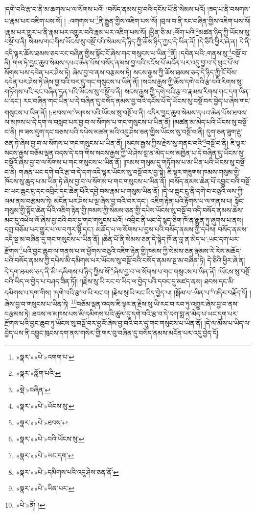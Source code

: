།དགེ་བའི་རྩ་བ་ནི་མ་ཆགས་པ་ལ་སོགས་པའོ། །བསོད་ནམས་བྱ་བའི་དངོས་པོ་ནི་སེམས་པའོ། །ཟད་པ་ནི་བསགས་པ་རྣམ་པར་འཇིག་པས་སོ། །
:འགགས་པ་\footnote{«སྣར་»«པེ་»འགག་པ་}ནི་རྒྱུན་གྱིས་འཇིག་པས་སོ། །བྲལ་བ་ནི་རང་བཞིན་གྱིས་འཇིག་པས་སོ། །རྣམ་པར་གྱུར་པ་ནི་རྣམ་པར་འགྱུར་བའི་རྣམ་པར་འཇིག་པས་སོ། །ཕྱིན་ཅི་མ་:ལོག་པའི་\footnote{«སྣར་»སློག་པའི་}མཚན་ཉིད་ཀྱི་ཡོངས་སུ་བསྔོ་བ་ནི། སེམས་གང་གིས་ཡོངས་སུ་བསྔོ་བའི་སེམས་དེ་ཉིད་ཀྱི་ཆོས་ཉིད་ཀྱང་དེ་ཡིན་ནོ། །དེ་ཅིའི་ཕྱིར་ཞེ་ན། དེ་ནི་འདི་ལྟར་ཆོས་ཐམས་ཅད་རང་བཞིན་གྱིས་སྟོང་ངོ་ཞེས་གང་གསུངས་པ་ཡིན་\footnote{«སྡེ་»བཞིན་}ནོ། །དབེན་པའི་:གནས་སུ་\footnote{«སྣར་»«པེ་»ཡོངས་སུ་}བསྔོ་བ་ནི། གལ་ཏེ་བྱང་ཆུབ་སེམས་དཔའ་ཆེན་པོས་བསོད་ནམས་བྱ་བའི་དངོས་པོ་མངོན་པར་འདུ་བྱ་བ་དེ་ཕུང་པོ་ལ་སོགས་པས་དབེན་པར་ཤེས་ཏེ། ཞེས་བྱ་བ་ནས་བརྩམས་ཏེ། སངས་རྒྱས་ཀྱི་ཆོས་ཐམས་ཅད་དེ་ཉིད་ཀྱི་ངོ་བོས་དབེན་པར་ཤེས་ཏེ་ཞེས་བྱ་བའི་བར་དུ་གང་གསུངས་པ་ཡིན་ནོ། །སངས་རྒྱས་ཀྱི་ཆོས་དགེ་བའི་རྩ་བའི་རིགས་སུ་གཏོགས་པའི་རང་བཞིན་དྲན་པའི་ཡོངས་སུ་བསྔོ་བ་ནི། སངས་རྒྱས་ཀྱི་དགེ་བའི་རྩ་བ་རྣམས་རིགས་གང་དག་ཡིན་པ་དང་། རང་བཞིན་གང་ཡིན་པ་དེ་བཞིན་དུ་བསོད་ནམས་བྱ་བའི་དངོས་པོ་དེ་ཡོངས་སུ་བསྔོ་བར་བྱེད་པ་ཞེས་གང་གསུངས་པ་ཡིན་ནོ། །:ཐབས་ལ་\footnote{«སྣར་»«པེ་»ཐབས་}མཁས་པའི་ཡོངས་སུ་བསྔོ་བ་ནི། འདིར་བྱང་ཆུབ་སེམས་དཔའ་ཆེན་པོས་ཐབས་ལ་མཁས་པ་དེ་དག་ལ་བསླབ་པར་བྱ་བ་ལ་སོགས་པ་གང་གསུངས་པ་ཡིན་ནོ། །མཚན་མ་མེད་པའི་ཡོངས་སུ་བསྔོ་བ་ནི། ཁ་ཟས་དུག་དང་བཅས་པའི་དཔེས་མཚན་མའི་འདུ་ཤེས་ཅན་གྱིས་ཡོངས་སུ་བསྔོ་བ་ནི། དུག་ཅན་ཟུག་རྔུ་ཅན་ཏེ་ཞེས་བྱ་བ་ལ་སོགས་པ་གང་གསུངས་པ་ཡིན་ནོ། །སངས་རྒྱས་ཀྱིས་རྗེས་སུ་གནང་བའི་\footnote{«སྣར་»«པེ་»བའི་ཡོངས་སུ་}བསྔོ་བ་ནི། ཇི་ལྟར་སངས་རྒྱས་བཅོམ་ལྡན་འདས་དེ་དག་གིས་སངས་རྒྱས་ཀྱི་ཡེ་ཤེས་བླ་ན་མེད་པས་མཁྱེན་པ་དེ་བཞིན་དུ་ཡོངས་སུ་བསྔོའོ་ཞེས་བྱ་བ་ལ་སོགས་པ་གང་གསུངས་པ་ཡིན་ནོ། །ཁམས་གསུམ་དུ་གཏོགས་པ་མ་ཡིན་པའི་ཡོངས་སུ་བསྔོ་བ་ནི། གཞན་ཡང་དགེ་བའི་རྩ་བ་དེ་དག་འདི་ལྟར་ཡོངས་སུ་བསྔོ་བར་བྱ་སྟེ། ཇི་ལྟར་གཟུགས་ཁམས་གསུམ་གྱི་ཁོངས་སུ་ཆུད་པ་མ་ཡིན་ཏེ་ཞེས་བྱ་བ་ལ་སོགས་པ་གང་གསུངས་པ་ཡིན་ནོ། །བསོད་ནམས་ཆེན་པོ་འབྱུང་བའི་བསྔོ་བ་ཡང་ཆུང་ངུ་དང་འབྲིང་དང་ཆེན་པོའི་དབྱེ་བས་རྣམ་པ་གསུམ་ཡིན་ནོ། །དེ་ལ་ཆུང་ངུ་ནི་དགེ་བ་བཅུའི་ལས་ཀྱི་ལམ་ནས་བརྩམས་ཏེ། མངོན་པར་ཤེས་པ་ལྔ་ཞེས་བྱ་བའི་བར་དང་། འཇིག་རྟེན་པའི་རྟོགས་པ་ལ་གནས་པ། སྟོང་གསུམ་གྱི་སྟོང་ཆེན་པོའི་འཇིག་རྟེན་གྱི་ཁམས་ཀྱི་སེམས་ཅན་གྱི་དཔེས་ཡོངས་སུ་བསྔོ་བ་འདི་བསོད་ནམས་ཆེས་མང་དུ་འཕེལ་ལོ་ཞེས་བྱ་བའི་བར་དུ་གང་གསུངས་པའོ། །འབྲིང་ནི་ཡང་དེ་སྙད་ཅིག་ཁོ་ན་རྒྱུན་ཏུ་ཞུགས་པ་ནས། དགྲ་བཅོམ་པར་གྱུར་པ་ལ་བཀུར་སྟི་དང་། མཆོད་པ་ལ་སོགས་པ་བྱས་པའི་བསོད་ནམས་ཀྱི་དཔེས། བསོད་ནམས་འདི་སྔ་མ་བཞིན་དུ་གང་གསུངས་པ་ཡིན་ནོ། །ཆེན་པོ་ནི་སེམས་ཅན་དེ་སྙེད་ཁོ་ན་བླ་ན་མེད་པ་:ཡང་དག་པར་རྫོགས་\footnote{«སྣར་»«པེ་»ཡང་དག་}པའི་བྱང་ཆུབ་ལ་གནས་པ་ལ་ཕྱོགས་བཅུའི་འཇིག་རྟེན་གྱི་ཁམས་ཀྱི་སེམས་ཅན་རྣམས་རེ་རེས་མཆོད་པའི་བསོད་ནམས་ཀྱི་དཔེས་མི་དམིགས་པར་ཡོངས་སུ་བསྔོ་བའི་བསོད་ནམས་སྔ་མ་བཞིན་ཏེ། དེ་ཅིའི་ཕྱིར་ཞེ་ན། དེ་དག་ཐམས་ཅད་ནི་མི་:དམིགས་པ་ཉིད་ཀྱིས་སོ་\footnote{«སྣར་»«པེ་»དམིགས་པའི་འདུ་ཤེས་ཅན་ནོ་}ཞེས་བྱ་བ་ལ་སོགས་པ་གང་གསུངས་པ་ཡིན་ནོ། །ཡོངས་སུ་བསྔོ་བའི་ཡིད་ལ་བྱེད་པ་བཤད་ཟིན་ཏོ།། །།རྗེས་སུ་ཡི་རང་བ་ཡིད་ལ་བྱེད་པའི་དབང་དུ་མཛད་ནས། ཐབས་དང་མི་དམིགས་པ་དག་གིས། །དགེ་བའི་རྩ་ལ་ཡི་རང་བ། །རྗེས་སུ་ཡི་རང་ཡིད་བྱེད་པ། །སྒོམ་པ་:ཡིན་པ་\footnote{«སྣར་»«པེ་»ཡིན་པར་}འདིར་བརྗོད་དོ། །ཞེས་བྱ་བ་གསུངས་པ་ཡིན་ཏེ། \footnote{«པེ་»ནོ། ། }བཅོམ་ལྡན་འདས་ཇི་ལྟར་ན་རྗེས་སུ་ཡི་རང་བ་རབ་ཏུ་འགྱུར་ཞེས་བྱ་བ་ནས་བརྩམས་ཏེ། ཐབས་ལ་མཁས་པས་མི་དམིགས་པའི་ཚུལ་དུ་དགེ་བའི་རྩ་བ་དེ་དག་བླ་ན་མེད་པ་ཡང་དག་པར་རྫོགས་པའི་བྱང་ཆུབ་ཏུ་ཡོངས་སུ་བསྔོ་བར་བྱའོ་ཞེས་བྱ་བའི་བར་དུ་གང་གསུངས་པ་ཡིན་ནོ། །དེ་ལ་མོས་པ་ཡིད་ལ་བྱེད་པས་ནི་འབྱུང་ཁུངས་དག་ནས་གསེར་གྱི་གར་བུ་བཞིན་དུ་བསོད་ནམས་མངོན་པར་འདུ་བྱེད་དོ། 